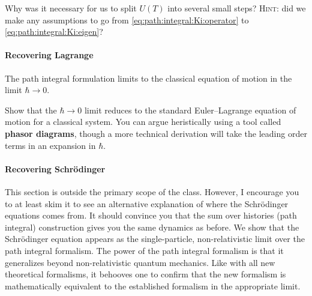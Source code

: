 \begin{exercise}
Why was it necessary for us to split $U(T)$ into several small steps? \textsc{Hint}: did we make any assumptions to go from \eqref{eq:path:integral:Ki:operator} to \eqref{eq:path:integral:Ki:eigen}? 
\end{exercise}

\paragraph{Recovering Lagrange}
The path integral formulation limits to the classical equation of motion in the limit $\hbar \to 0$. 
\begin{exercise}
Show that the $\hbar \to 0$ limit reduces to the standard Euler--Lagrange equation of motion for a classical system. You can argue heristically using a tool called \textbf{phasor diagrams}, though a more technical derivation will take the leading order terms in an expansion in $\hbar$.
\end{exercise}


\paragraph{Recovering Schr\"odinger}
This section is outside the primary scope of the class. However, I encourage you to at least skim it to see an alternative explanation of where the Schr\"odinger equations comes from. It should convince you that the sum over histories (path integral) construction gives you the same dynamics as before. 
% 
% 
We show that the Schr\"odinger equation appears as the single-particle, non-relativistic limit over the path integral formalism. The power of the path integral formalism is that it generalizes beyond non-relativistic quantum mechanics. Like with all new theoretical formalisms, it behooves one to confirm that the new formalism is mathematically equivalent to the established formalism in the appropriate limit.

